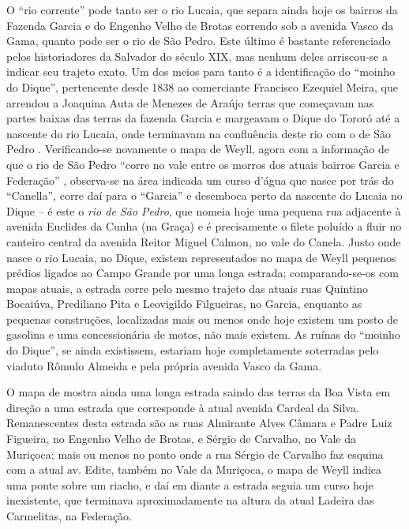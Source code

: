 O ``rio corrente'' pode tanto ser o rio Lucaia, que separa ainda hoje os bairros da Fazenda Garcia e do Engenho Velho de Brotas correndo sob a avenida Vasco da Gama, quanto pode ser o rio de São Pedro. Este último é bastante referenciado pelos historiadores da Salvador do século XIX, mas nenhum deles arriscou-se a indicar seu trajeto exato. Um dos meios para tanto é a identificação do ``moinho do Dique'', pertencente desde 1838 ao comerciante Francisco Ezequiel Meira, que arrendou a Joaquina Auta de Menezes de Araújo terras que começavam nas partes baixas das terras da fazenda Garcia e margeavam o Dique do Tororó até a nascente do rio Lucaia, onde terminavam na confluência deste rio com o de São Pedro \cite[p.~38]{CASTILLO2017}. Verificando-se novamente o mapa de Weyll, agora com a informação de que o rio de São Pedro ``corre no vale entre os morros dos atuais bairros Garcia e Federação'' \cite[p.~39]{CASTILLO2017}, observa-se na área indicada um curso d'água que nasce por trás do ``Canella'', corre daí para o ``Garcia'' e desemboca perto da nascente do Lucaia no Dique -- é este o \textit{rio de São Pedro}, que nomeia hoje uma pequena rua adjacente à avenida Euclides da Cunha (na Graça) e é precisamente o filete poluído a fluir no canteiro central da avenida Reitor Miguel Calmon, no vale do Canela. Justo onde nasce o rio Lucaia, no Dique, existem representados no mapa de Weyll pequenos prédios ligados ao Campo Grande por uma longa estrada; comparando-se-os com mapas atuais, a estrada corre pelo mesmo trajeto das atuais ruas Quintino Bocaiúva, Prediliano Pita e Leovigildo Filgueiras, no Garcia, enquanto as pequenas construções, localizadas mais ou menos onde hoje existem um posto de gasolina e uma concessionária de motos, não mais existem. As ruínas do ``moinho do Dique'', se ainda existissem, estariam hoje completamente soterradas pelo viaduto Rômulo Almeida e pela própria avenida Vasco da Gama.

O mapa de  mostra ainda uma longa estrada saindo das terras da Boa Vista em direção a uma estrada que corresponde à atual avenida Cardeal da Silva. Remanescentes desta estrada são as ruas Almirante Alves Câmara e Padre Luiz Figueira, no Engenho Velho de Brotas, e Sérgio de Carvalho, no Vale da Muriçoca; mais ou menos no ponto onde a rua Sérgio de Carvalho faz esquina com a atual av. Edite, também no Vale da Muriçoca, o mapa de Weyll indica uma ponte sobre um riacho, e daí em diante a estrada seguia um curso hoje inexistente, que terminava aproximadamente na altura da atual Ladeira das Carmelitas, na Federação. 

